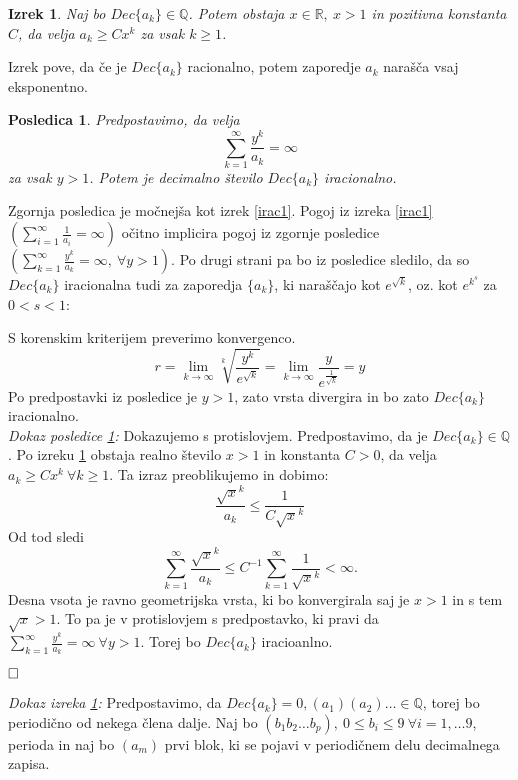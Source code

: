 \documentclass[a4paper,12pt]{article}
\def\Q{\mathbb{Q}} %
\def\R{\mathbb{R}} %
\def\qed{$\hfill\Box$}   %
\newtheorem{izrek}{Izrek}
\newtheorem{posledica}{Posledica}
\begin{document}
\begin{izrek}
    \label{izrek1clanek2}
    Naj bo $Dec\{a_k\} \in \Q$. Potem obstaja $x \in \R, \ x > 1$ in pozitivna konstanta $C$,
    da velja $a_k \geq Cx^k$ za vsak $k \geq 1$.
\end{izrek}

Izrek pove, da če je $Dec\{a_k\}$ racionalno, potem zaporedje $a_k$ narašča vsaj eksponentno.

\begin{posledica}
    \label{posledica}
    Predpostavimo, da velja
    \[
        \sum_{k=1}^{\infty}\frac{y^k}{a_k} = \infty\]
    za vsak $y > 1$. Potem je decimalno število $Dec\{a_k\}$ iracionalno.
\end{posledica}

Zgornja posledica je močnejša kot izrek \ref{irac1}. Pogoj iz izreka \ref{irac1} 
$(\sum_{i=1}^{\infty} \frac{1}{a_i} = \infty)$ očitno implicira
pogoj iz zgornje posledice $(\sum_{k=1}^{\infty}\frac{y^k}{a_k} = \infty , \ \forall y > 1)$.
Po drugi strani pa bo iz posledice sledilo, da so $Dec\{a_k\}$ iracionalna tudi za zaporedja
$\{a_k\}$, ki naraščajo kot $e^{\sqrt{k}}$, oz. kot $e^{k^s}$ za $0 < s < 1$:

S korenskim kriterijem preverimo konvergenco.
\[
    r = \lim_{k \rightarrow \infty}\sqrt[k]{\frac{y^k}{e^{\sqrt{k}}}} = \lim_{k \rightarrow \infty}\frac{y}{e^{\frac{1}{\sqrt{k}}}}
    = y
\]
Po predpostavki iz posledice je $y > 1$, zato vrsta divergira in bo zato $Dec\{a_k\}$ iracionalno.
\\

\noindent
{\em Dokaz posledice \ref{posledica}:\/}
Dokazujemo s protislovjem. Predpostavimo, da je $Dec\{a_k\} \in \Q$.
Po izreku \ref{izrek1clanek2} obstaja realno število $x > 1$ in konstanta $C>0$, da velja
$a_k \geq Cx^k \ \forall k \geq 1$. Ta izraz preoblikujemo in dobimo:
\[
    \frac{\sqrt{x}^k}{a_k} \leq \frac{1}{C\sqrt{x}^k}\] 
Od tod sledi
\[ \sum_{k=1}^{\infty} \frac{\sqrt{x}^k}{a_k} \leq C^{-1} \sum_{k=1}^{\infty} \frac{1}{\sqrt{x}^k} < \infty.\]
Desna vsota je ravno geometrijska vrsta, ki bo konvergirala saj je $x > 1$ in s tem $\sqrt{x} > 1$.
To pa je v protislovjem s predpostavko, ki pravi da $\sum_{k=1}^{\infty}\frac{y^k}{a_k} = \infty \ \forall y>1$.
Torej bo $Dec\{a_k\}$ iracioanlno.

\qed

{\em Dokaz izreka \ref{izrek1clanek2}:\/} Predpostavimo, da $Dec\{a_k\} = 0,(a_1)(a_2)\dots \in \Q$, torej bo 
periodično od nekega člena dalje. Naj bo
$(b_1b_2 \dots b_p), \ 0 \leq b_i \leq 9 \ \forall i = 1, \dots 9$, perioda in naj bo
$(a_m)$ prvi blok, ki se pojavi v periodičnem delu decimalnega zapisa.
\end{document}
